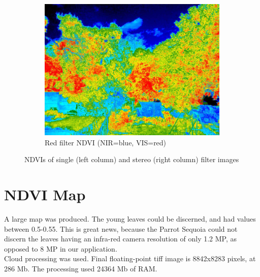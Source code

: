 \begin{appendices}
\begin{figure}[H]
\begin{subfigure}{0.5\textwidth}
\includegraphics[scale=0.17]{filter/red_d_ndvi.jpg}
\caption{Red filter NDVI (NIR=blue, VIS=red)}
\end{subfigure}
\caption{NDVIs of single (left column) and stereo (right column) filter images}
\label{fig:filters_ndvis}
\end{figure}

\chapter{NDVI Map}
\label{app:ndvi_map}

A large map was produced. The young leaves could be discerned, and had values between 0.5-0.55. This is great news, because the Parrot Sequoia could not discern the leaves having an infra-red camera resolution of only 1.2 MP, as opposed to 8 MP in our application.\\

Cloud processing was used. Final floating-point tiff image is 8842x8283 pixels, at 286 Mb. The processing used 24364 Mb of RAM.\\


\end{appendices}
